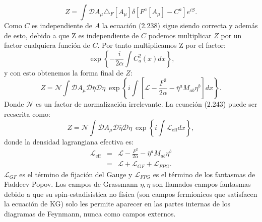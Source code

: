\begin{equation}
Z=\int\mathcal{D}A_{\mu}\triangle_{F}[A_{\mu}]\delta[F^{a}[A_{\mu}]-C^a]e^{iS}.
\end{equation}
Como $C$ es independiente de $A$ la ecuación (2.238) sigue siendo correcta y además de esto, debido a que Z es independiente de $C$ podemos multiplicar $Z$ por un factor cualquiera función de $C$. Por tanto multiplicamos Z por el factor:
\begin{equation}
\ \exp\left\{ -\frac{i}{2\alpha}\int C_{a}^{2}(x)dx\right\} ,
\end{equation}
y con esto obtenemos la forma final de $Z$:
\begin{equation}
Z=\mathcal{N}\int\mathcal{D}A_{\mu}\mathcal{D}\bar{\eta}\mathcal{D}\eta\ \exp\left\{ i\int[\mathcal{L}-\frac{F^{2}}{2\alpha}-\bar{\eta}^aM_{ab}\eta^{b}]dx\right\} .
\end{equation}
Donde $\mathcal{N}$ es un factor de normalización irrelevante. La ecuación (2.243) puede ser reescrita como:
\begin{equation}
Z=\mathcal{N}\int\mathcal{D}A_{\mu}\mathcal{D}\bar{\eta}\mathcal{D}\eta\ \exp\left\{ i\int\mathcal{L}_{\text{eff}}dx\right\} ,
\end{equation}
donde la densidad lagrangiana efectiva es:
\begin{eqnarray}
\nonumber \mathcal{L}_{\text{eff}}&=&\mathcal{L}-\frac{F^{2}}{2\alpha}-\bar{\eta}^aM_{ab}\eta^{b}\\
&=& \mathcal{L}+\mathcal{L}_{GF}+\mathcal{L}_{FPG}.
\end{eqnarray}
$\mathcal{L}_{GF}$ es el término de fijación del Gauge y $\mathcal{L}_{FPG}$ es el término de los fantasmas de Faddeev-Popov. Los campos de Grassmann $\eta,\bar{\eta}$ son llamados campos fantasmas debido a que su spin-estadisistica no física (son campos fermionicos que satisfacen la ecuación de KG) solo les permite aparecer en las partes internas de los diagramas de Feynmann, nunca como campos externos. 
